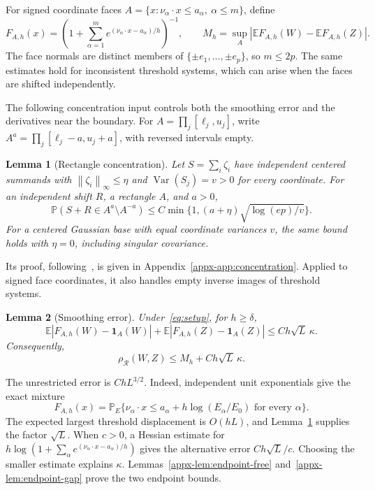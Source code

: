 \documentclass[11pt,letterpaper]{article}
\newtheorem{lemma}{Lemma}
\theoremstyle{remark}
\newcommand{\E}{\mathbb E}
\newcommand{\Pp}{\mathbb P}
\newcommand{\Var}{\operatorname{Var}}
\newcommand{\norm}[1]{\left\lVert#1\right\rVert}
\newcommand{\rh}{\rho_{\mathcal R}}
\newcommand{\ind}{\mathbf 1}
\begin{document}
For signed coordinate faces
\(A=\{x:\nu_\alpha\cdot x\le a_\alpha,\ \alpha\le m\}\), define
\begin{equation}
 F_{A,h}(x)=\left(1+\sum_{\alpha=1}^m
          e^{(\nu_\alpha\cdot x-a_\alpha)/h}\right)^{-1},
 \qquad M_h=\sup_A|\E F_{A,h}(W)-\E F_{A,h}(Z)|.
 \label{eq:selector}
\end{equation}
The face normals are distinct members of \(\{\pm e_1,\ldots,\pm e_p\}\),
so \(m\le2p\). The same estimates hold for inconsistent threshold
systems, which can arise when the faces are shifted independently.

The following concentration input controls both the smoothing error
and the derivatives near the boundary. For
\(A=\prod_j[\ell_j,u_j]\), write
\(A^a=\prod_j[\ell_j-a,u_j+a]\), with reversed intervals empty.
\begin{lemma}[Rectangle concentration]\label{lem:concentration}
Let \(S=\sum_i\zeta_i\) have independent centered summands with
\(\norm{\zeta_i}_\infty\le\eta\) and
\(\Var(S_j)=v>0\) for every coordinate. For an independent shift
\(R\), a rectangle \(A\), and \(a>0\),
\[
 \Pp(S+R\in A^a\setminus A^{-a})
 \le C\min\{1,(a+\eta)\sqrt{\log(ep)/v}\}.
\]
For a centered Gaussian base with equal coordinate variances \(v\),
the same bound holds with \(\eta=0\), including singular covariance.
\end{lemma}
Its proof, following~\cite[Lemma~2.1]{AL}, is given in
Appendix~\ref{appx-app:concentration}. Applied to signed face
coordinates, it also handles empty inverse images of threshold systems.

\begin{lemma}[Smoothing error]\label{lem:endpoint}
Under~\eqref{eq:setup}, for \(h\ge\delta\),
\begin{equation}
 \E|F_{A,h}(W)-\ind_A(W)|+
 \E|F_{A,h}(Z)-\ind_A(Z)|\le Ch\sqrt L\,\kappa.
 \label{eq:endpoint-error}
\end{equation}
Consequently,
\begin{equation}
 \rh(W,Z)\le M_h+Ch\sqrt L\,\kappa.
 \label{eq:endpoint-min}
\end{equation}
\end{lemma}
The unrestricted error is \(ChL^{3/2}\). Indeed, independent unit
exponentials give the exact mixture
\[
 F_{A,h}(x)=\Pp_E\{\nu_\alpha\cdot x\le
 a_\alpha+h\log(E_\alpha/E_0)\text{ for every }\alpha\}.
\]
The expected largest threshold displacement is \(O(hL)\), and
Lemma~\ref{lem:concentration} supplies the factor \(\sqrt L\).
When \(c>0\), a Hessian estimate for
\(h\log(1+\sum_\alpha e^{(\nu_\alpha\cdot x-a_\alpha)/h})\)
gives the alternative error \(Ch\sqrt L/c\). Choosing the smaller
estimate explains \(\kappa\). Lemmas~\ref{appx-lem:endpoint-free}
and~\ref{appx-lem:endpoint-gap} prove the two endpoint bounds.
\end{document}
